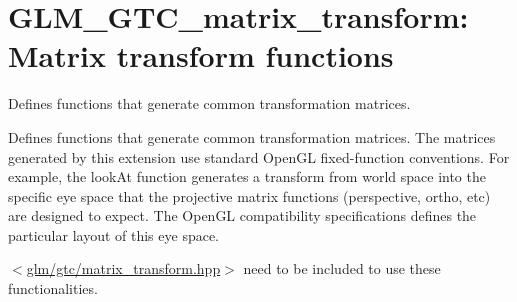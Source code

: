 \hypertarget{group__gtc__matrix__transform}{\section{\-G\-L\-M\-\_\-\-G\-T\-C\-\_\-matrix\-\_\-transform\-: \-Matrix transform functions}
\label{group__gtc__matrix__transform}
}


\-Defines functions that generate common transformation matrices.  


\-Defines functions that generate common transformation matrices. \-The matrices generated by this extension use standard \-Open\-G\-L fixed-\/function conventions. \-For example, the look\-At function generates a transform from world space into the specific eye space that the projective matrix functions (perspective, ortho, etc) are designed to expect. \-The \-Open\-G\-L compatibility specifications defines the particular layout of this eye space.

$<$\hyperlink{matrix__transform_8hpp}{glm/gtc/matrix\-\_\-transform.\-hpp}$>$ need to be included to use these functionalities. 